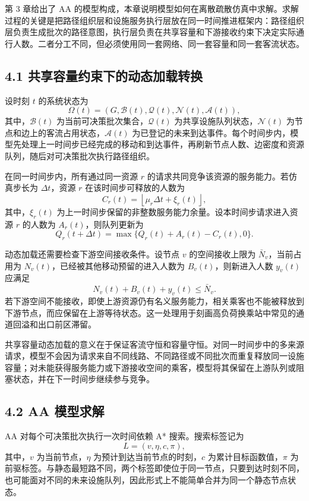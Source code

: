 \documentclass[UTF8,a4paper,12pt]{ctexart}
\begin{document}
第 3 章给出了 AA 的模型构成，本章说明模型如何在离散疏散仿真中求解。求解过程的关键是把路径组织层和设施服务执行层放在同一时间推进框架内：路径组织层负责生成批次的路径意图，执行层负责在共享容量和下游接收约束下决定实际通行人数。二者分工不同，但必须使用同一套网络、同一套容量和同一套客流状态。

\subsection{4.1 共享容量约束下的动态加载转换}

设时刻 \(t\) 的系统状态为
\[
\Omega(t)=\left(G,\mathcal{B}(t),\mathcal{Q}(t),\mathcal{N}(t),\mathcal{A}(t)\right),
\]
其中，\(\mathcal{B}(t)\) 为当前可决策批次集合，\(\mathcal{Q}(t)\) 为共享设施队列状态，\(\mathcal{N}(t)\) 为节点和边上的客流占用状态，\(\mathcal{A}(t)\) 为已登记的未来到达事件。每个时间步内，模型先处理上一时间步已经完成的移动和到达事件，再刷新节点人数、边密度和资源队列，随后对可决策批次执行路径组织。

在同一时间步内，所有通过同一资源 \(r\) 的请求共同竞争该资源的服务能力。若仿真步长为 \(\Delta t\)，资源 \(r\) 在该时间步可释放的人数为
\[
C_r(t)=\left\lfloor \mu_r\Delta t+\xi_r(t)\right\rfloor ,
\]
其中，\(\xi_r(t)\) 为上一时间步保留的非整数服务能力余量。设本时间步请求进入资源 \(r\) 的人数为 \(A_r(t)\)，则队列更新为
\[
Q_r(t+\Delta t)=\max\{Q_r(t)+A_r(t)-C_r(t),0\}.
\]

动态加载还需要检查下游空间接收条件。设节点 \(v\) 的空间接收上限为 \(\bar N_v\)，当前占用为 \(N_v(t)\)，已经被其他移动预留的进入人数为 \(B_v(t)\)，则新进入人数 \(y_v(t)\) 应满足
\[
N_v(t)+B_v(t)+y_v(t)\leq \bar N_v .
\]
若下游空间不能接收，即使上游资源仍有名义服务能力，相关乘客也不能被释放到下游节点，而应保留在上游等待状态。这一处理用于刻画高负荷换乘站中常见的通道回溢和出口前区滞留。

共享容量动态加载的意义在于保证客流守恒和容量守恒。对同一时间步中的多来源请求，模型不会因为请求来自不同线路、不同路径或不同批次而重复释放同一设施容量；对未能获得服务能力或下游接收空间的乘客，模型将其保留在上游队列或阻塞状态，并在下一时间步继续参与竞争。

\subsection{4.2 AA 模型求解}

AA 对每个可决策批次执行一次时间依赖 A* 搜索。搜索标签记为
\[
L=(v,\eta,c,\pi),
\]
其中，\(v\) 为当前节点，\(\eta\) 为预计到达当前节点的时刻，\(c\) 为累计目标函数值，\(\pi\) 为前驱标签。与静态最短路不同，两个标签即使位于同一节点，只要到达时刻不同，也可能面对不同的未来设施队列，因此形式上不能简单合并为同一个静态节点状态。
\end{document}
